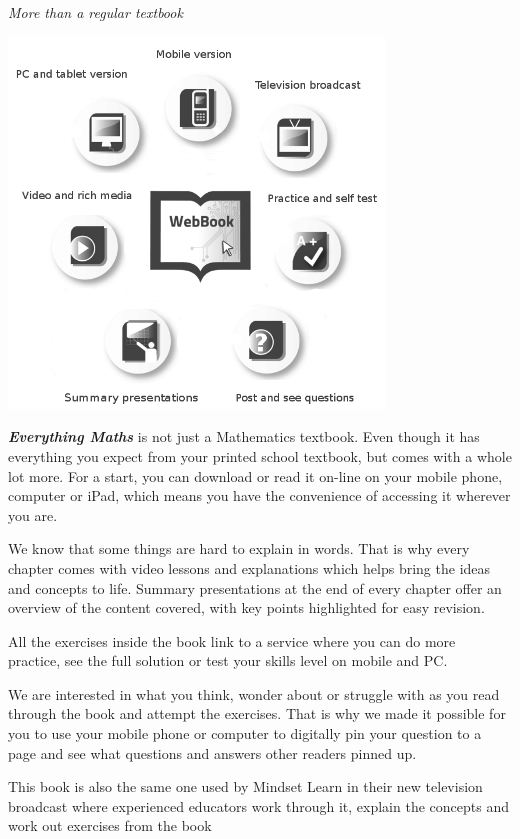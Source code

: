
\newpage
\thispagestyle{empty}

{\normalfont\sffamily\fontsize{22}\normalfont\itshape More than a regular textbook} \par

\begin{center}
\includegraphics[width=0.75\textwidth]{../title_images/morethantextbook.png}
\end{center}

\par
{\Large
\textbf{\textit{Everything Maths}} is not just a Mathematics textbook. Even though it has everything you expect from
your printed school textbook, but comes with a whole lot more. For a start, you can download or read it
on-line on your mobile phone, computer or iPad, which means you have the convenience of accessing
it wherever you are.\par


We know that some things are hard to explain in words. That is why every chapter comes with video
lessons and explanations which helps bring the ideas and concepts to life. Summary presentations at
the end of every chapter offer an overview of the content covered, with key points highlighted for easy
revision.\par


All the exercises inside the book link to a service where you can do more practice, see the full solution
or test your skills level on mobile and PC.\par


We are interested in what you think, wonder about or struggle with as you read through the book and
attempt the exercises. That is why we made it possible for you to use your mobile phone or computer to
digitally pin your question to a page and see what questions and answers other readers pinned up.\par


This book is also the same one used by Mindset Learn in their new television broadcast where
experienced educators work through it, explain the concepts and work out exercises from the book
}




